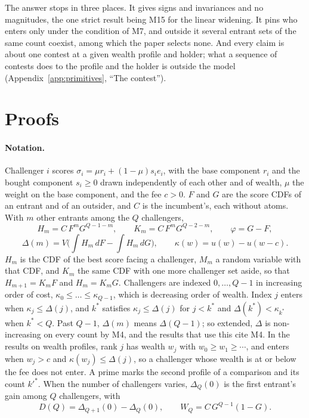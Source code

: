\normalsize

The answer stops in three places. It gives signs and invariances and no
magnitudes, the one strict result being M15 for the linear widening. It pins who
enters only under the condition of M7, and outside it several entrant sets of
the same count coexist, among which the paper selects none. And every claim is
about one contest at a given wealth profile and holder; what a sequence of
contests does to the profile and the holder is outside the model
(Appendix~\ref{app:primitives}, ``The contest'').

\appendix

\section{Proofs}
\label{app:proofs}

\paragraph{Notation.} Challenger $i$ scores $\sigma_i=\mu r_i+(1-\mu)s_ie_i$, with
the base component $r_i$ and the bought component $s_i\ge0$ drawn independently
of each other and of wealth, $\mu$ the weight on the base component, and the fee
$c>0$. $F$ and $G$ are the score CDFs
of an entrant and of an outsider, and $C$ is the incumbent's, each without atoms.
With $m$ other entrants among the $Q$ challengers,
\[
  H_m=C\,F^{m}G^{Q-1-m},\qquad K_m=C\,F^{m}G^{Q-2-m},\qquad \varphi=G-F,
\]
\[
  \Delta(m)=V\Big(\int H_m\,dF-\int H_m\,dG\Big),\qquad \kappa(w)=u(w)-u(w-c).
\]
$H_m$ is the CDF of the best score facing a challenger, $M_m$ a random variable
with that CDF, and $K_m$ the same CDF with one more challenger set aside, so that
$H_{m+1}=K_mF$ and $H_m=K_mG$.
Challengers are indexed $0,\dots,Q-1$ in increasing order of cost,
$\kappa_0\le\dots\le\kappa_{Q-1}$, which is decreasing order of wealth. Index $j$
enters when $\kappa_j\le\Delta(j)$, and $k^*$ satisfies $\kappa_j\le\Delta(j)$ for
$j<k^*$ and $\Delta(k^*)<\kappa_{k^*}$ when $k^*<Q$. Past $Q-1$, $\Delta(m)$ means
$\Delta(Q-1)$; so extended, $\Delta$ is non-increasing on every count by M4, and
the results that use this cite M4. In the results on wealth
profiles, rank $j$ has wealth $w_j$ with $w_0\ge w_1\ge\cdots$, and enters when
$w_j>c$ and $\kappa(w_j)\le\Delta(j)$, so a challenger whose wealth is at or below
the fee does not enter. A prime marks the second profile of a comparison and its count
$k'^*$. When the number of challengers varies, $\Delta_Q(0)$ is the first
entrant's gain among $Q$ challengers, with
\[
  D(Q)=\Delta_{Q+1}(0)-\Delta_Q(0),\qquad W_Q=C\,G^{Q-1}(1-G).
\]

